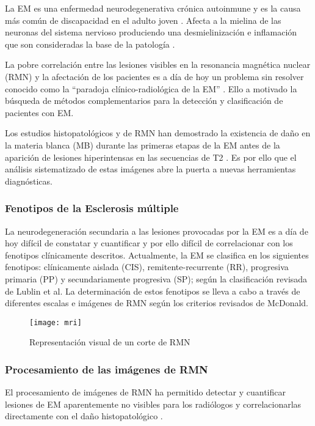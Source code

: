 \documentclass[fleqn,12pt]{UICArticle} %
\begin{document}
La EM es una enfermedad neurodegenerativa crónica autoinmune y es la causa más común de discapacidad en el adulto joven \cite{Polman2011}. Afecta a la mielina de las neuronas del sistema nervioso produciendo una desmielinización e inflamación que son consideradas la base de la patología \cite{Br2005}.

La pobre correlación entre las lesiones visibles en la resonancia magnética nuclear (RMN) y la afectación de los pacientes es a día de hoy un problema sin resolver conocido como la “paradoja clínico-radiológica de la EM” \cite{Barkhof2002}. Ello a motivado la búsqueda de métodos complementarios para la detección y clasificación de pacientes con EM.

Los estudios histopatológicos y de RMN han demostrado la existencia de daño en la materia blanca (MB) durante las primeras etapas de la EM antes de la aparición de lesiones hiperintensas en las secuencias de T2 \cite{Beer2016}. Es por ello que el análisis sistematizado de estas imágenes abre la puerta a nuevas herramientas diagnósticas.

\subsubsection{Fenotipos de la Esclerosis múltiple}

La neurodegeneración secundaria a las lesiones provocadas por la EM es a día de hoy difícil de constatar y cuantificar y por ello difícil de correlacionar con los fenotipos clínicamente descritos. Actualmente, la EM se clasifica en los siguientes fenotipos: clínicamente aislada (CIS), remitente-recurrente (RR), progresiva primaria (PP) y secundariamente progresiva (SP); según la clasificación revisada de Lublin et al\cite{Lublin2014}. La determinación de estos fenotipos se lleva a cabo a través de diferentes escalas e imágenes de RMN según los criterios revisados de McDonald\cite{Polman20112}.

\begin{figure}[h]
	\centering
	\texttt{[image: mri]}
	\caption{Representación visual de un corte de RMN}
	\label{fig:voxeles}
\end{figure}

\subsubsection{Procesamiento de las imágenes de RMN}

El procesamiento de imágenes de RMN ha permitido detectar y cuantificar lesiones de EM aparentemente no visibles para los radiólogos y correlacionarlas directamente con el daño histopatológico \cite{Beer2016}.
\end{document}
